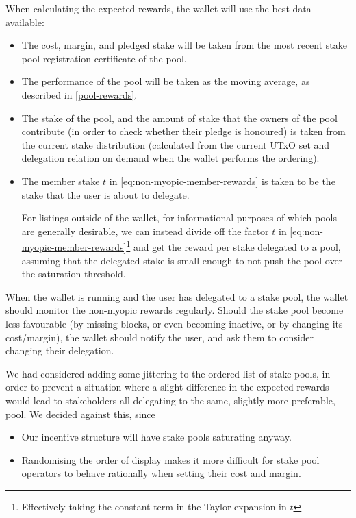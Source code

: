 \documentclass[11pt,a4paper]{article}
\begin{document}
When calculating the expected rewards, the wallet will use the
best data available:
\begin{itemize}
\item The cost, margin, and pledged stake will be taken from the most
  recent stake pool registration certificate of the pool.
\item The performance of the pool will be taken as the moving average, as
  described in \cref{pool-rewards}.
\item The stake of the pool, and the amount of stake that the owners
  of the pool contribute (in order to check whether their pledge is
  honoured) is taken from the current stake distribution (calculated
  from the current UTxO set and delegation relation on demand when the
  wallet performs the ordering).
\item The member stake \(t\) in \cref{eq:non-myopic-member-rewards} is taken to
  be the stake that the user is about to delegate.

  For listings outside of the wallet, for informational purposes of which pools
  are generally desirable, we can instead divide off the factor \(t\) in
  \cref{eq:non-myopic-member-rewards}\footnote{Effectively taking the constant
    term in the Taylor expansion in \(t\)} and get the reward per stake
  delegated to a pool, assuming that the delegated stake is small enough to not
  push the pool over the saturation threshold.
\end{itemize}

When the wallet is running and the user has delegated to a stake pool, the
wallet should monitor the non-myopic rewards regularly. Should the stake pool
become less favourable (by missing blocks, or even becoming inactive, or by
changing its cost/margin), the wallet should notify the user, and ask them to
consider changing their delegation.

We had considered adding some jittering to the ordered list of stake pools, in
order to prevent a situation where a slight difference in the expected rewards would
lead to stakeholders all delegating to the same, slightly more preferable, pool.
We decided against this, since
\begin{itemize}
\item Our incentive structure will have stake pools saturating anyway.
\item Randomising the order of display makes it more difficult for stake pool
  operators to behave rationally when setting their cost and margin.
\end{itemize}
\end{document}
